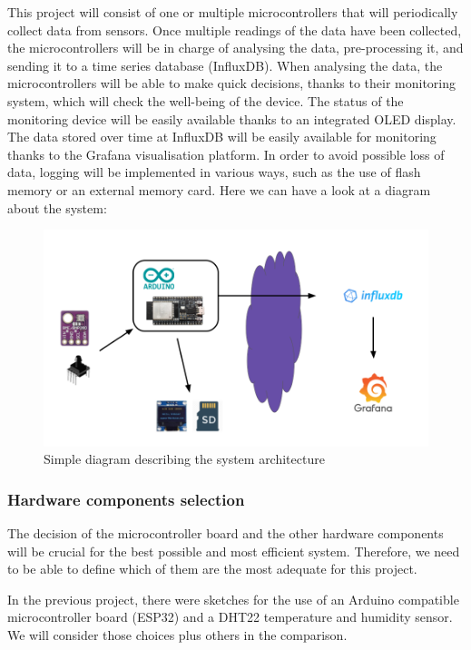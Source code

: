 \documentclass[12pt]{article}
\begin{document}
This project will consist of one or multiple microcontrollers that will periodically collect data from sensors. Once multiple readings of the data have been collected, the microcontrollers will be in charge of analysing the data, pre-processing it, and sending it to a time series database (InfluxDB). When analysing the data, the microcontrollers will be able to make quick decisions, thanks to their monitoring system, which will check the well-being of the device. The status of the monitoring device will be easily available thanks to an integrated OLED display. The data stored over time at InfluxDB will be easily available for monitoring thanks to the Grafana visualisation platform. In order to avoid possible loss of data, logging will be implemented in various ways, such as the use of flash memory or an external memory card. Here we can have a look at a diagram about the system:

\begin{figure}[h]
\label{fig:system-arch}
\includegraphics[scale=0.45]{system-arch}
\centering
\caption{Simple diagram describing the system architecture}
\end{figure}

\subsubsection{Hardware components selection}

The decision of the microcontroller board and the other hardware components will be crucial for the best possible and most efficient system. Therefore, we need to be able to define which of them are the most adequate for this project.\par

In the previous project, there were sketches for the use of an Arduino compatible microcontroller board (ESP32) and a DHT22 temperature and humidity sensor. We will consider those choices plus others in the comparison.\par
\end{document}

